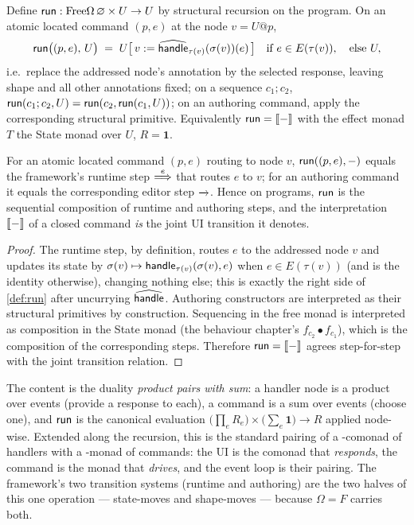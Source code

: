 \documentclass[../uxoxo-main]{subfiles}
\begin{document}
\begin{definition}\label{def:run}
Define $\mathsf{run}:\mathrm{Free}\Omega\,\varnothing \times U \to U$ by structural recursion on
the program. On an atomic located command $(p,e)$ at the node $v=U@p$,
\[
  \mathsf{run}\bigl((p,e),\,U\bigr) \;=\; U\bigl[\,v \mathrel{:=} \widehat{\mathsf{handle}}_{\tau(v)}(\sigma(v))(e)\,\bigr]
  \quad\text{if } e\in E(\tau(v)),\quad\text{else } U,
\]
i.e.\ replace the addressed node's annotation by the selected response, leaving
shape and all other annotations fixed; on a sequence $c_1;c_2$,
$\mathsf{run}(c_1;c_2,U)=\mathsf{run}(c_2,\mathsf{run}(c_1,U))$; on an authoring command, apply the
corresponding structural primitive. Equivalently $\mathsf{run}=\llbracket - \rrbracket$ with the effect
monad $T$ the State monad over $U$, $R=\mathbf 1$.
\end{definition}

\begin{theorem}\label{thm:pairing}
For an atomic located command $(p,e)$ routing to node $v$,
$\mathsf{run}((p,e),-)$ equals the framework's runtime step $\overset{e}{\Longrightarrow}$ that routes $e$
to $v$; for an authoring command it equals the corresponding editor step
$\xrightarrow{\,\,}$. Hence on programs, $\mathsf{run}$ is the sequential composition of runtime and
authoring steps, and the interpretation $\llbracket - \rrbracket$ of a closed command \emph{is} the
joint UI transition it denotes.
\end{theorem}

\begin{proof}
The runtime step, by definition, routes $e$ to the addressed node $v$ and updates
its state by $\sigma(v)\mapsto\mathsf{handle}_{\tau(v)}(\sigma(v),e)$ when $e\in E(\tau(v))$
(and is the identity otherwise), changing nothing else; this is exactly the right
side of \cref{def:run} after uncurrying $\widehat{\mathsf{handle}}$. Authoring constructors
are interpreted as their structural primitives by construction. Sequencing in the
free monad is interpreted as composition in the State monad
(the behaviour chapter's $f_{c_2}\bullet f_{c_1}$), which is the composition of the
corresponding steps. Therefore $\mathsf{run}=\llbracket - \rrbracket$ agrees step-for-step with the joint
transition relation.
\end{proof}

\begin{remark}\label{rem:pairing}
The content is the duality \emph{product pairs with sum}: a handler node is a
product over events (provide a response to each), a command is a sum over events
(choose one), and $\mathsf{run}$ is the canonical evaluation
$\bigl(\textstyle\prod_e R_e\bigr)\times\bigl(\textstyle\sum_e \mathbf 1\bigr)\to R$
applied node-wise. Extended along the recursion, this is the standard pairing of a
-comonad of handlers with a -monad of commands: the UI is the
comonad that \emph{responds}, the command is the monad that \emph{drives}, and the
event loop is their pairing. The framework's two transition systems (runtime and
authoring) are the two halves of this one operation --- state-moves and
shape-moves --- because $\Omega=F$ carries both.
\end{remark}
\end{document}
